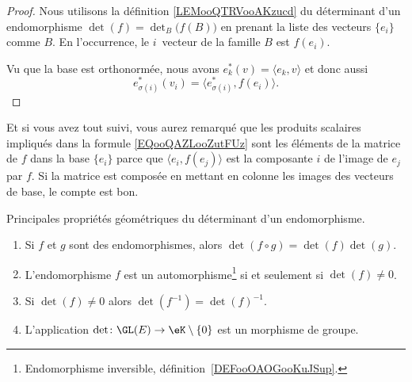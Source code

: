 \begin{proof}
    Nous utilisons la définition \ref{LEMooQTRVooAKzucd} du déterminant d'un endomorphisme \( \det(f)=\det_B\big( f(B) \big)\) en prenant la liste des vecteurs \( \{ e_i \}\) comme \( B\). En l'occurrence, le \( i\)\ieme\ vecteur de la famille \( B\) est \( f(e_i)\).

    Vu que la base est orthonormée, nous avons \( e^*_k(v)=\langle e_k, v\rangle \) et donc aussi
    \begin{equation}
        e^*_{\sigma(i)}(v_i)=\langle e_{\sigma(i)}^*, f(e_i)\rangle.
    \end{equation}
\end{proof}

Et si vous avez tout suivi, vous aurez remarqué que les produits scalaires impliqués dans la formule \eqref{EQooQAZLooZutFUz} sont les éléments de la matrice de \( f\) dans la base \( \{ e_i \}\) parce que \( \langle e_i, f(e_j)\rangle \) est la composante \( i\) de l'image de \( e_j\) par \( f\). Si la matrice est composée en mettant en colonne les images des vecteurs de base, le compte est bon.

\begin{proposition}     \label{PropYQNMooZjlYlA}
    Principales propriétés géométriques du déterminant d'un endomorphisme.
    \begin{enumerate}
        \item   \label{ItemUPLNooYZMRJy}
            Si \( f\) et \( g\)  sont des endomorphismes, alors \( \det(f\circ g)=\det(f)\det(g)\).
        \item       \label{ITEMooNZNLooODdXeH}
            L'endomorphisme \( f\) est un automorphisme\footnote{Endomorphisme inversible, définition~\ref{DEFooOAOGooKuJSup}.} si et seulement si \( \det(f)\neq 0\).
        \item   \label{ITEMooZMVXooLGjvCy}
            Si \( \det(f)\neq 0\) alors \( \det(f^{-1})=\det(f)^{-1}\).
        \item       \label{ItemooPJVYooYSwqaE}
            L'application \( \det\colon \GL(E)\to \eK\setminus\{ 0 \}\) est un morphisme de groupe.
    \end{enumerate}
\end{proposition}

